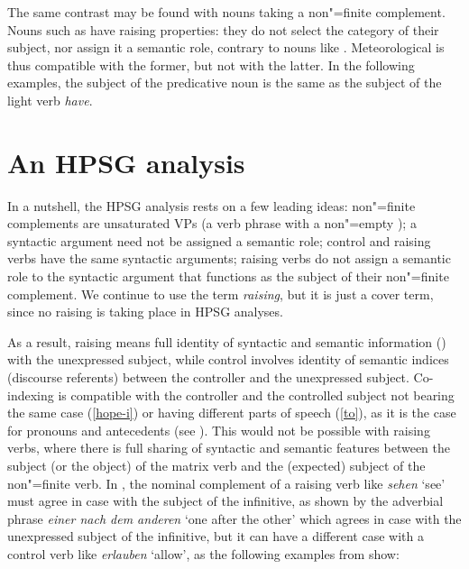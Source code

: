 \documentclass[output=paper
	        ,collection
	        ,collectionchapter
 	        ,biblatex
                ,babelshorthands
                ,newtxmath
                ,draftmode
                ,colorlinks, citecolor=brown
]{langscibook}
\begin{document}
\eal
{}
\zl

The same contrast may be found with  nouns taking a non"=finite complement. Nouns such as  have raising properties: they do not select the category of their subject, nor assign it a semantic role, contrary to nouns like . Meteorological  is thus compatible with the former, but not with the latter. In the following examples, the subject of the predicative noun is the same as the subject of the light verb \emph{have}.


\eal
{}
\zl

\section{An HPSG analysis}


In a nutshell, the HPSG analysis rests on a few leading ideas: non"=finite complements are
unsaturated VPs (a verb phrase with a non"=empty \subjl); a syntactic argument need not be assigned
a semantic role; control and raising verbs have the same syntactic arguments; raising verbs do not
assign a semantic role to the syntactic argument that functions as the subject of their non"=finite
complement. We continue to use the term \emph{raising}, but it is just a cover term, since no raising
is taking place in HPSG analyses. 

As a result,  raising means full identity of syntactic and semantic
information ()  with the unexpressed subject, while
control involves identity of semantic indices (discourse referents) between the controller and the
unexpressed subject. Co-indexing is compatible with the controller and the controlled subject not
bearing the same case (\ref{hope-i}) or having different parts of speech (\ref{to}), as it is the
case for pronouns and antecedents (see ). This would not be possible
with raising verbs, where there is full sharing of syntactic and semantic features between the
subject (or the object) of the matrix verb and the (expected) subject of the non"=finite verb. In
, the nominal complement of a raising verb like \emph{sehen} `see' must agree in case
with the subject of the infinitive, as shown by the adverbial phrase \emph{einer nach dem anderen} `one after the other' which
agrees in case with the unexpressed subject of the infinitive, but it can have a different case with
a control verb like \emph{erlauben} `allow', as the following examples from  show: 
\end{document}

